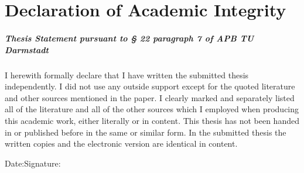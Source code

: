 	\chapter{Declaration of Academic Integrity}
	\vspace{11pt}
	\paragraph{Thesis Statement pursuant to § 22 paragraph 7 of APB TU Darmstadt}
	\vspace{11pt}
	\noindent I herewith formally declare that I have written the submitted thesis independently. I did not use any outside support except for the quoted literature and other sources mentioned in the paper. I clearly marked and separately listed all of the literature and all of the other sources which I employed when producing this academic work, either literally or in content. This thesis has not been handed in or published before in the same or similar form.\newline
	In the submitted thesis the written copies and the electronic version are identical in content.\vspace{40pt}
	
	\noindent Date:\hspace{0.4\textwidth}Signature:
	\vspace*{2cm}